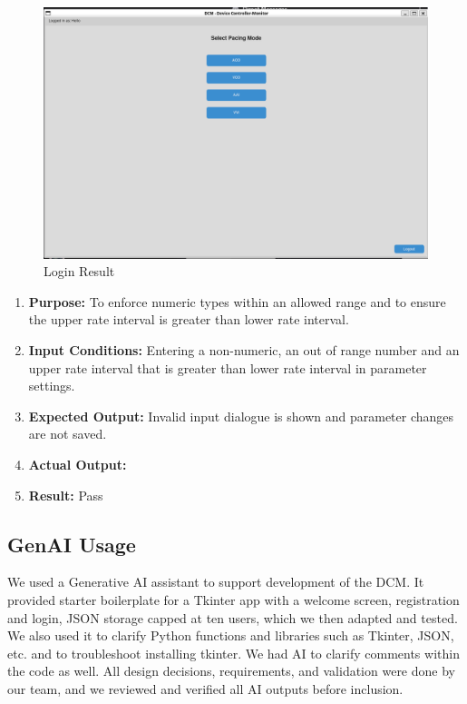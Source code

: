 \documentclass{article}
\newcounter{subsubsubsection}[subsubsection]
\begin{document}
\begin{tcolorbox}
    \begin{figure}[H]\label{logres}
        \includegraphics[width=\textwidth]{loginres.png}
        \caption{Login Result}
    \end{figure}
\end{tcolorbox}

\newpage
{}
\begin{enumerate}[label=]
   \item \textbf{Purpose:} To enforce numeric types within an allowed range and to ensure the upper rate interval is greater than lower rate interval. 
   \item \textbf{Input Conditions:} Entering a non-numeric, an out of range number and an upper rate interval that is greater than lower rate interval in parameter settings. 
   \item \textbf{Expected Output:} Invalid input dialogue is shown and parameter changes are not saved.
   \item \textbf{Actual Output:}  
   \item \textbf{Result:} Pass
\end{enumerate}


\newpage
\subsection{GenAI Usage}

We used a Generative AI assistant to support development of the DCM. It provided starter boilerplate for a 
Tkinter app with a welcome screen, registration and login, JSON storage capped at ten users, which we then 
adapted and tested. We also used it to clarify Python functions and libraries such as Tkinter, JSON, etc. 
and to troubleshoot installing tkinter. We had AI to clarify comments within the code as well. All design 
decisions, requirements, and validation were done by our team, and we reviewed and verified all AI outputs 
before inclusion. 
\end{document}

